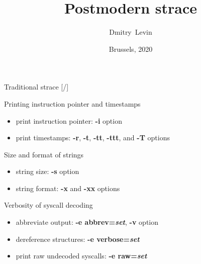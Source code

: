 \documentclass[unicode,aspectratio=169,xcolor={table,dvipsnames,usernames}]{beamer}
\title{\Huge Postmodern strace}
\author{\Huge Dmitry~Levin}
\date{\Large Brussels, 2020}
\begin{document}
\begin{frame}[noframenumbering]
\titlepage
\end{frame}

\begin{frame}{Traditional strace \hfill [\insertframenumber/\inserttotalframenumber]}
\large
\begin{block}{Printing instruction pointer and timestamps}
\begin{itemize}
\item print instruction pointer: \textbf{-i} option
\item print timestamps: \textbf{-r}, \textbf{-t}, \textbf{-tt}, \textbf{-ttt}, and \textbf{-T} options
\end{itemize}
\end{block}

\begin{block}{Size and format of strings}
\begin{itemize}
\item string size: \textbf{-s} option
\item string format: \textbf{-x} and \textbf{-xx} options
\end{itemize}
\end{block}

\begin{block}{Verbosity of syscall decoding}
\begin{itemize}
\item abbreviate output: \textbf{-e abbrev=\textit{set}}, \textbf{-v} option
\item dereference structures: \textbf{-e verbose=\textit{set}}
\item print raw undecoded syscalls: \textbf{-e raw=\textit{set}}
\end{itemize}
\end{block}
\end{frame}
\end{document}
